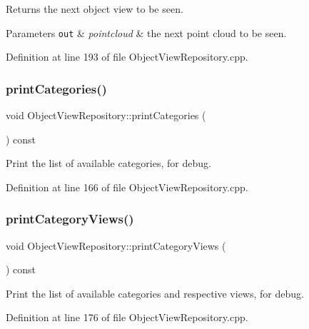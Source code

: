 Returns the next object view to be seen.


\begin{DoxyParams}[1]{Parameters}
\mbox{\tt out}  & {\em pointcloud} & the next point cloud to be seen. \\
\hline
\end{DoxyParams}


Definition at line 193 of file Object\+View\+Repository.\+cpp.

\mbox{\label{class_object_view_repository_afb69d2aac573032b3c10a57060d2eab7}} 
\subsubsection{\texorpdfstring{print\+Categories()}{printCategories()}}
{\footnotesize\ttfamily void Object\+View\+Repository\+::print\+Categories (\begin{DoxyParamCaption}{ }\end{DoxyParamCaption}) const}

Print the list of available categories, for debug. 

Definition at line 166 of file Object\+View\+Repository.\+cpp.

\mbox{\label{class_object_view_repository_a5fe3f74c032f0d24f695eaee1714071c}} 
\subsubsection{\texorpdfstring{print\+Category\+Views()}{printCategoryViews()}}
{\footnotesize\ttfamily void Object\+View\+Repository\+::print\+Category\+Views (\begin{DoxyParamCaption}{ }\end{DoxyParamCaption}) const}

Print the list of available categories and respective views, for debug. 

Definition at line 176 of file Object\+View\+Repository.\+cpp.

